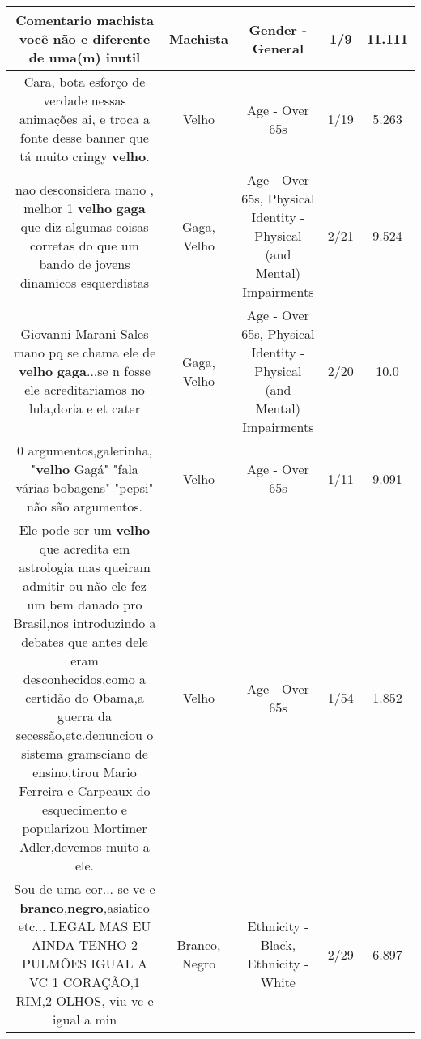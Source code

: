 \documentclass[11pt]{article}
\newlength\mylength
\begin{document}
\begin{center}
\begin{longtable}{|C{.65\mylength}|C{.30\mylength}|C{.12\mylength}|C{.12\mylength}|C{.12\mylength}|}
  \small Comentario \textbf{machista} você não e diferente de uma(m) inutil\normalsize   & Machista & Gender - General & 1/9 & 11.111 \\  \hline
  \small Cara, bota esforço de verdade nessas animações ai, e troca a fonte desse banner que tá muito cringy \textbf{velho}.\normalsize   & Velho & Age - Over 65s & 1/19 & 5.263 \\  \hline
  \small nao desconsidera mano , melhor 1 \textbf{velho} \textbf{gaga} que diz algumas coisas corretas do que um bando de jovens dinamicos esquerdistas\normalsize   & Gaga, Velho & Age - Over 65s, Physical Identity - Physical (and Mental) Impairments & 2/21 & 9.524 \\  \hline
  \small Giovanni Marani Sales mano pq se chama ele de \textbf{velho} \textbf{gaga}...se n fosse ele acreditariamos no lula,doria e et cater\normalsize   & Gaga, Velho & Age - Over 65s, Physical Identity - Physical (and Mental) Impairments & 2/20 & 10.0 \\  \hline
  \small 0 argumentos,galerinha, "\textbf{velho} Gagá" "fala várias bobagens" "pepsi" não são argumentos.\normalsize   & Velho & Age - Over 65s & 1/11 & 9.091 \\  \hline
  \small Ele pode ser um \textbf{velho} que acredita em astrologia mas queiram admitir ou não ele fez um bem danado pro Brasil,nos introduzindo a debates que antes dele eram desconhecidos,como a certidão do Obama,a guerra da secessão,etc.denunciou o sistema gramsciano de ensino,tirou Mario Ferreira e Carpeaux do esquecimento e popularizou Mortimer Adler,devemos muito a ele.\normalsize   & Velho & Age - Over 65s & 1/54 & 1.852 \\  \hline
  \small Sou de uma cor... se vc e \textbf{branco},\textbf{negro},asiatico etc... LEGAL MAS EU AINDA TENHO 2 PULMÕES IGUAL A VC 1 CORAÇÃO,1 RIM,2 OLHOS, viu vc e igual a min\normalsize   & Branco, Negro & Ethnicity - Black, Ethnicity - White & 2/29 & 6.897 \\  \hline

\end{longtable}
\end{center}
\end{document}
